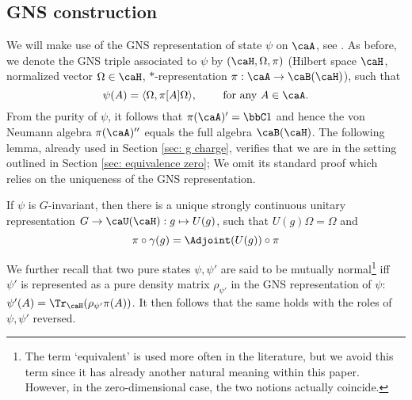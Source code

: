 \subsection{GNS construction}\label{sec: representations}
We will make use of the GNS representation of state $\psi$ on $\caA$, see \cite{BratRob}. As before, we denote the GNS triple associated to $\psi$ by   $(\caH,\Omega,\pi)$ 
(Hilbert space $\caH$,  normalized vector $\Omega\in\caH$,  $*$-representation  $\pi:\caA\to\caB(\caH)$), such that 
$$\psi(A)=\langle\Omega, \pi[A]\Omega\rangle, \qquad \text{ for any $A\in\caA$}.  $$     From the purity of $\psi$, it follows that $\pi(\caA)'=\bbC 1$ and hence the von Neumann algebra $\pi(\caA)''$ equals the full algebra $\caB(\caH)$. The following lemma, already used in Section \ref{sec: g charge}, verifies that we are in the setting outlined in Section \ref{sec: equivalence zero}; We omit its standard proof which relies on the uniqueness of the GNS representation.
\begin{lemma}\label{lem: gns} If $\psi$ is $G$-invariant, then there is a unique strongly continuous unitary representation $G\to \caU(\caH): g\mapsto U(g)$, such that $U(g)\Omega=\Omega$ and
	\begin{equation} \label{eq: rep of g action}
	\pi\circ \gamma(g)= \Adjoint(U(g))\circ \pi
	\end{equation}
\end{lemma} 
\noindent We further recall that two pure states $\psi,\psi'$ are said to be mutually normal\footnote{The term `equivalent' is used more often in the literature, but we avoid this term since it has already another natural meaning within this paper. However, in the zero-dimensional case, the two notions actually coincide.} iff\  $\psi'$ is represented as a pure density matrix $\rho_{\psi'}$ in the GNS representation of $\psi$: $\psi'(A) = \Tr_\caH(\rho_{\psi'}\pi(A))$. It then follows that the same holds with the roles of $\psi,\psi'$ reversed. 


